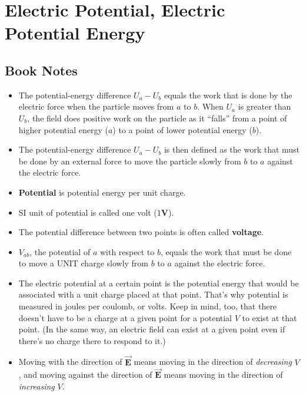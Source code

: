 \documentclass[11pt]{article}
\newcommand{\chapterTitle}{Electric Potential, Electric Potential Energy}
\begin{document}
\section{\chapterTitle}

\subsection{Book Notes}
\begin{itemize}
    \item The potential-energy difference $U_a - U_b$ equals the work that is done by the electric force when the particle moves from $a$ to $b$. When $U_a$ is greater than $U_b$, the field does positive work on the particle as it “falls” from a point of higher potential energy ($a$) to a point of lower potential energy ($b$).
    \item The potential-energy difference $U_a - U_b$ is then defined as the work that must be done by an external force to move the particle slowly from $b$ to $a$ against the electric force.
    \item \textbf{Potential} is potential energy per unit charge.
    \item SI unit of potential is called one volt ($1 \mathbf{V}$).
    \item The potential difference between two points is often called \textbf{voltage}.
    \item $V_{ab}$, the potential of $a$ with respect to $b$, equals the work that must be done to move a UNIT charge slowly from $b$ to $a$ against the electric force.
    \item The electric potential at a certain point is the potential energy that would be associated with a unit charge placed at that point. That’s why potential is measured in joules per coulomb, or volts. Keep in mind, too, that there doesn’t have to be a charge at a given point for a potential $V$ to exist at that point. (In the same way, an electric field can exist at a given point even if there’s no charge there to respond to it.)
    \item Moving with the direction of $\mathbf{\vec{E}}$ means moving in the direction of \textit{decreasing} $V$, and moving against the direction of $\mathbf{\vec{E}}$ means moving in the direction of \textit{increasing} $V$.
\end{itemize}
\end{document}
